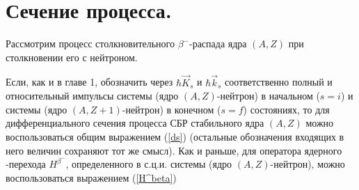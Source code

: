 \section{Сечение процесса.}

Рассмотрим процесс столкновительного $\beta^-$-распада ядра $(A,Z)$ при
столкновении его с нейтроном.

Если, как и в главе 1, обозначить через $\hbar \vec K_s$ и $\hbar \vec k_s$ соответственно
полный  и относительный импульсы системы (ядро $(A,Z)$-нейтрон) в начальном
($s=i$) и системы (ядро $(A,Z+1)$-нейтрон) в конечном ($s=f$) состояниях,
то для дифференциального сечения процесса СБР стабильного ядра $(A,Z)$
можно воспользоваться общим выражением (\ref{ds}) (остальные обозначения
входящих в него величин сохраняют тот же смысл). Как и раньше, для оператора
ядерного \be-перехода $H^{\beta^-}$, определенного в с.ц.и. системы
(ядро $(A,Z)$-нейтрон), можно воспользоваться выражением (\ref{H^beta})



%

%

